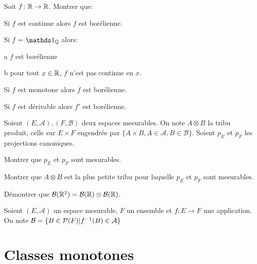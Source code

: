 \documentclass[french]{report}
\begin{document}
\begin{exo}
    Soit \(f\colon\R\to\R\). Montrer que:
    \begin{q}{1}
        Si \(f\) est continue alors \(f\) est borélienne.
    \end{q}
    \begin{q}{2}
        Si \(f\) = \(\ind_\Q\) alors:
        \begin{q}{a}
            \(f\) est borélienne
        \end{q}
        \begin{q}{b}
            pour tout \(x\in\R\), \(f\) n'est pas continue en \(x\).
        \end{q}
    \end{q}
    \begin{q}{3}
        Si \(f\) est monotone alors \(f\) est borélienne.
    \end{q}
    \begin{q}{4}
        Si \(f\) est dérivable alors \(f'\) est borélienne.
    \end{q}
\end{exo}

\begin{exo}
    Soient \(\left(E,\mathcal{A}\right),(F,\mathcal{B})\) deux espaces mesurables.
    On note \(A\otimes B\) la tribu produit, celle sur \(E\times F\) engendrée par
    \(\{A\times B, A\in\mathcal{A},B\in\mathcal{B}\}\). Soient \(p_E\) et \(p_F\)
    les projections canoniques.
    \begin{q}{1}
        Montrer que \(p_E\) et \(p_F\) sont mesurables.
    \end{q}
    \begin{q}{2}
        Montrer que \(A\otimes B\) est la plus petite tribu pour laquelle
        \(p_E\) et \(p_F\) sont mesurables.
    \end{q}
    \begin{q}{3}
        Démontrer que \(\bor[\R^2] = \bor\otimes\bor\).
    \end{q}
\end{exo}

\begin{exo}
    Soient \(\left(E,\mathcal{A}\right)\) un espace mesurable, \(F\) un ensemble
    et \(f\colon E\to F\) une application. On note
    \(\mathcal{B}=\{B\in\pow[F]|f^{-1}(B)\in\mathcal{A}\}\)
\end{exo}

\section*{Classes monotones}
\end{document}
